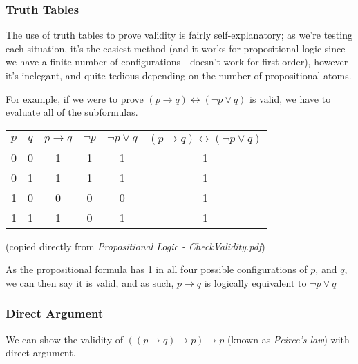 \documentclass[a4paper, 12pt]{article}
\begin{document}
            \subsubsection*{Truth Tables}
                The use of truth tables to prove validity is fairly self-explanatory; as we're testing each situation, it's the easiest method (and it works for propositional logic since we have a finite number of configurations - doesn't work for first-order), however it's inelegant, and quite tedious depending on the number of propositional atoms.
                \medskip

                For example, if we were to prove $(p \rightarrow q) \leftrightarrow (\neg p \lor q)$ is valid, we have to evaluate all of the subformulas.
                \begin{center}
                    \begin{tabular}{||c|c||c||c|c||c||}
                        \hline
                        $p$ & $q$ & $p \rightarrow q$ & $\neg p$ & $\neg p \lor q$ & $(p \rightarrow q) \leftrightarrow (\neg p \lor q)$ \\
                        \hline
                        0 & 0 & 1 & 1 & 1 & 1 \\
                        0 & 1 & 1 & 1 & 1 & 1 \\
                        1 & 0 & 0 & 0 & 0 & 1 \\
                        1 & 1 & 1 & 0 & 1 & 1 \\
                        \hline
                    \end{tabular}
                    \medskip

                    (copied directly from \textit{Propositional Logic - CheckValidity.pdf})
                \end{center}
                As the propositional formula has 1 in all four possible configurations of $p$, and $q$, we can then say it is valid, and as such, $p \rightarrow q$ is logically equivalent to $\neg p \lor q$
            \subsubsection*{Direct Argument}
                We can show the validity of $((p \rightarrow q) \rightarrow p) \rightarrow p$ (known as \textit{Peirce's law}) with direct argument.
                \medskip
\end{document}
